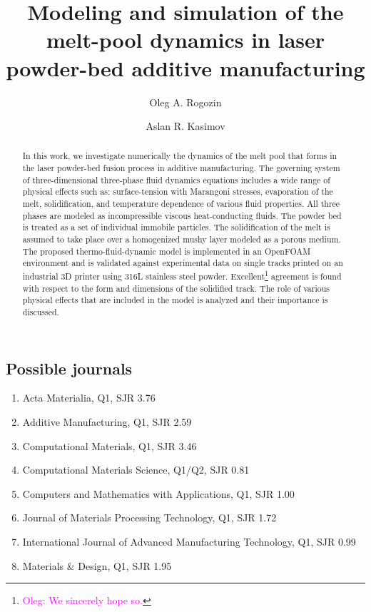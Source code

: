 \documentclass{article}
\title{Modeling and simulation of the melt-pool dynamics in laser powder-bed additive manufacturing}
\author{Oleg A. Rogozin}
\author{Aslan R. Kasimov}
\affil{Center for Design, Manufacturing and Materials \\
    Skolkovo Institute of Science and Technology, Moscow, Russia}
\date{}
\newcommand{\OpenFOAM}{OpenFOAM\textregistered\xspace}
\newcommand{\oleg}[1]{\textcolor{magenta}{\footnote{\textcolor{magenta}{Oleg: #1}}}} %
\begin{document}
\maketitle

\begin{abstract}
In this work, we investigate numerically the dynamics of the melt pool that forms in the laser powder-bed fusion process in additive manufacturing. The governing system of three-dimensional three-phase fluid dynamics equations  includes a wide range of physical effects such as: surface-tension with Marangoni stresses, evaporation of the melt, solidification, and temperature dependence of various fluid properties.
%
All three phases are modeled as incompressible viscous heat-conducting fluids. The powder bed is treated as a set of individual immobile particles. The solidification of the melt is assumed to take place over a homogenized mushy layer modeled as a porous medium.
%
The proposed thermo-fluid-dynamic model is implemented in an \OpenFOAM environment and is validated against experimental data on single tracks printed on an industrial 3D printer using 316L stainless steel powder.
Excellent\oleg{We sincerely hope so.} agreement is found with respect to the form and dimensions of the solidified track. The role of various physical effects that are included in the model is analyzed and their importance is discussed.
\end{abstract}

\tableofcontents

\subsection{Possible journals}
\begin{enumerate}
    \item Acta Materialia, Q1, SJR 3.76
    \item Additive Manufacturing, Q1, SJR 2.59
    \item Computational Materials, Q1, SJR 3.46
    \item Computational Materials Science, Q1/Q2, SJR 0.81
    \item Computers and Mathematics with Applications, Q1, SJR 1.00
    \item Journal of Materials Processing Technology, Q1, SJR 1.72
    \item International Journal of Advanced Manufacturing Technology, Q1, SJR 0.99
    \item Materials \& Design, Q1, SJR 1.95
\end{enumerate}
\end{document}
